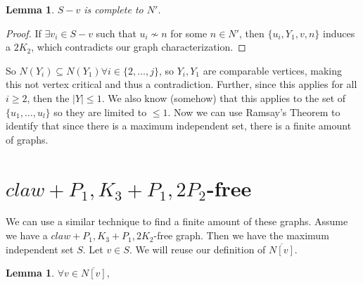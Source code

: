 \documentclass[11pt]{article}
\newtheorem{lemma}[theorem]{Lemma}
\theoremstyle{definition}
\newcommand{\noneighbs}{\overline{N[v]}}
\begin{document}
\begin{lemma}\label{lem:ScompleteNprime}
$S- v$ is complete to $N'$.
\end{lemma}
\begin{proof}
If $\exists v_i \in S - v$ such that $u_i \not \sim n$ for some $n \in N'$, then $\{ u_i, Y_1, v, n \}$ induces a $2K_2$, which contradicts our graph characterization.
\end{proof}

So $N(Y_i) \subseteq N(Y_1) \forall i \in \{2, \dots, j\}$, so $Y_i, Y_1$ are comparable vertices, making this not vertex critical and thus a contradiction. Further, since this applies for all $i \geq 2$, then the $|Y| \leq 1$. We also know (somehow) that this applies to the set of $\{u_1, \dots, u_l \}$ so they are limited to $\leq 1$.
Now we can use Ramsay's Theorem to identify that since there is a maximum independent set, there is a finite amount of graphs.

\section{$claw + P_1, K_3 + P_1, 2P_2$-free}
We can use a similar technique to find a finite amount of these graphs. Assume we have a $claw + P_1, K_3 + P_1, 2K_2$-free graph. Then we have the maximum independent set $S$. Let $v \in S$. We will reuse our definition of $\noneighbs$.
\begin{lemma}\label{lem:clawminset}
$\forall v \in \noneighbs, $
\end{lemma}
\end{document}
